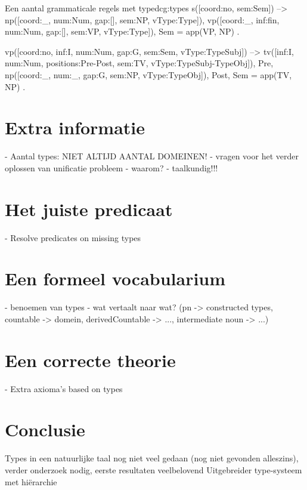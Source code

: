 
\begin{dcg}{Een aantal grammaticale regels met type}{dcg:types}
s([coord:no, sem:Sem]) -->
  np([coord:_, num:Num, gap:[], sem:NP, vType:Type]),
  vp([coord:_, inf:fin, num:Num, gap:[], sem:VP, vType:Type]),
  { Sem = app(VP, NP) }.

vp([coord:no, inf:I, num:Num, gap:G, sem:Sem, vType:TypeSubj]) -->
  tv([inf:I, num:Num, positions:Pre-Post, sem:TV, vType:TypeSubj-TypeObj]),
  Pre,
  np([coord:_, num:_, gap:G, sem:NP, vType:TypeObj]),
  Post,
  { Sem = app(TV, NP) }.
\end{dcg}

\section{Extra informatie}
- Aantal types: NIET ALTIJD AANTAL DOMEINEN!
- vragen voor het verder oplossen van unificatie probleem
- waarom?
- taalkundig!!!
\section{Het juiste predicaat}
- Resolve predicates on missing types
\section{Een formeel vocabularium}
- benoemen van types
- wat vertaalt naar wat? (pn -> constructed types, countable -> domein, derivedCountable -> ..., intermediate noun -> ...)
\section{Een correcte theorie}
- Extra axioma's based on types

\section{Conclusie}
Types in een natuurlijke taal nog niet veel gedaan (nog niet gevonden alleszins), verder onderzoek nodig, eerste resultaten veelbelovend
Uitgebreider type-systeem met hiërarchie

